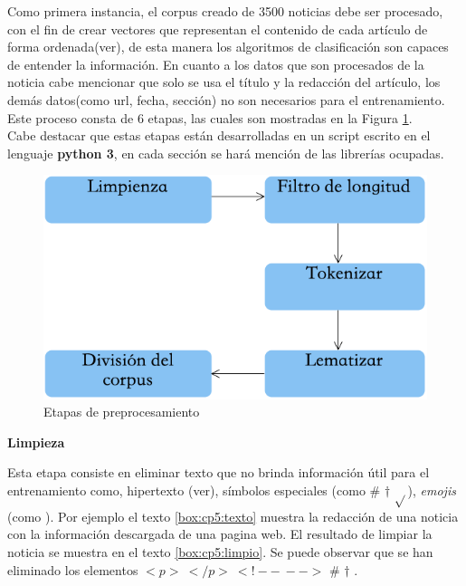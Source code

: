 Como primera instancia, el corpus creado de 3500 noticias debe ser procesado, con el fin de crear vectores que representan el contenido de cada artículo de forma ordenada(ver), de esta manera los algoritmos de clasificación son capaces de entender la información. En cuanto a los datos que son procesados de la noticia cabe mencionar que solo se usa el título y la redacción del artículo, los demás datos(como url, fecha, sección) no son necesarios para el entrenamiento. Este proceso consta de 6 etapas, las cuales son mostradas en la Figura \ref{fig:cp5:preprocesamiento}. \\

Cabe destacar que estas etapas están desarrolladas en un script escrito en el lenguaje \textbf{python 3}, en cada sección se hará mención de las librerías ocupadas.\\

\begin{figure}[h]
\centering
\includegraphics[scale=.55]{imagenes/capitulo5/preprocesamiento.png}
\caption{Etapas de preprocesamiento}
\label{fig:cp5:preprocesamiento}
\end{figure}

\begin{large}
\textbf{Limpieza}\\
\end{large}

Esta etapa consiste en eliminar texto que no brinda información útil para el entrenamiento como, hipertexto (ver), símbolos especiales (como \# $\dagger$ $\sqrt{ }$), \textit{emojis} (como \dSmiley \dCooley \dNinja). Por ejemplo el texto \ref{box:cp5:texto} muestra la redacción de una noticia con la información descargada de una pagina web. El resultado de limpiar la noticia se muestra en el texto \ref{box:cp5:limpio}. Se puede observar que se han eliminado los elementos $<p>\ </p>\ <!--\ -->$ \# $\dagger$ \dSmiley \dCooley \dInnocey.\\

